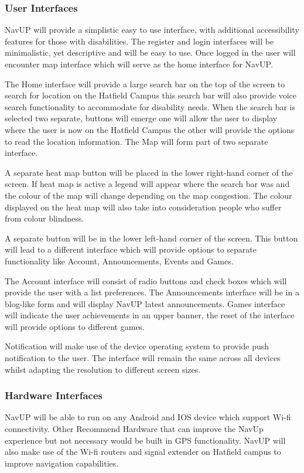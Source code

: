 \documentclass[12pt,a4paper]{article}
\begin{document}
		\subsubsection{User Interfaces}
			NavUP will provide a simplistic easy to use interface, with additional accessibility features for those with disabilities. The register and login interfaces will be minimalistic, yet descriptive and will be easy to use. Once logged in the user will encounter map interface which will serve as the home interface for NavUP.\newline

The Home interface will provide a large search bar on the top of the screen to search for location on the Hatfield Campus this search bar will also provide voice search functionality to accommodate for disability needs. When the search bar is selected two separate, buttons will emerge one will allow the user to display where the user is now on the Hatfield Campus the other will provide the options to read the location information. The Map will form part of two separate interface.\newline

A separate heat map button will be placed in the lower right-hand corner of the screen. If heat map is active a legend will appear where the search bar was and the colour of the map will change depending on the map congestion. The colour displayed on the heat map will also take into consideration people who suffer from colour blindness.\newline

A separate button will be in the lower left-hand corner of the screen. This button will lead to a different interface which will provide options to separate functionality like Account, Announcements, Events and Games.\newline

The Account interface will consist of radio buttons and check boxes which will provide the user with a list preferences. The Announcements interface will be in a blog-like form and will display NavUP latest announcements. Games interface will indicate the user achievements in an upper banner, the reset of the interface will provide options to different games.\newline

Notification will make use of the device operating system to provide push notification to the user. The interface will remain the same across all devices whilst adapting the resolution to different screen sizes.
		\subsubsection{Hardware Interfaces}
			NavUP will be able to run on any Android and IOS device which support Wi-fi connectivity. Other Recommend Hardware that can improve the NavUp experience but not necessary would be built in GPS functionality. NavUP will also make use of the Wi-fi routers and signal extender on Hatfield campus to improve navigation capabilities.
\end{document}
